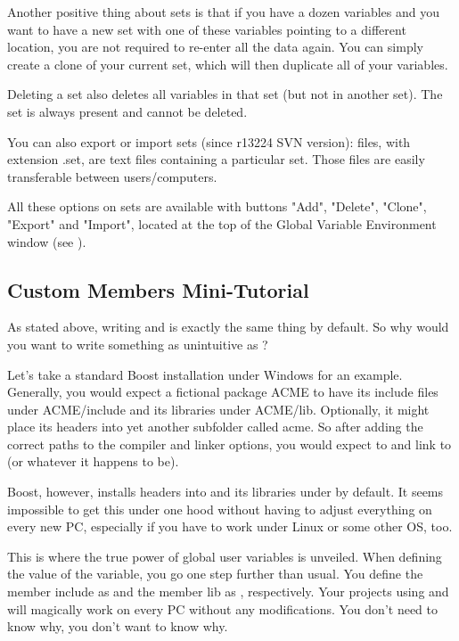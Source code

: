 Another positive thing about sets is that if you have a dozen variables and you want to have a new set with one of these variables pointing to a different location, you are not required to re-enter all the data again. You can simply create a clone of your current set, which will then duplicate all of your variables.

Deleting a set also deletes all variables in that set (but not in another set). The  set is always present and cannot be deleted.

You can also export or import sets (since r13224 SVN version): files, with extension .set, are text files containing a particular set. Those files are easily transferable between users/computers.

All these options on sets are available with buttons "Add", "Delete", "Clone", "Export" and "Import", located at the top of the Global Variable Environment window (see ).

\subsection{Custom Members Mini-Tutorial}\label{sec:mini_tutorial}

As stated above, writing  and  is exactly the same thing by default. So why would you want to write something as unintuitive as ?

Let's take a standard Boost installation under Windows for an example. Generally, you would expect a fictional package ACME to have its include files under ACME/include and its libraries under ACME/lib. Optionally, it might place its headers into yet another subfolder called acme. So after adding the correct paths to the compiler and linker options, you would expect to  and link to  (or whatever it happens to be).

Boost, however, installs headers into  and its libraries under  by default. It seems impossible to get this under one hood without having to adjust everything on every new PC, especially if you have to work under Linux or some other OS, too.

This is where the true power of global user variables is unveiled. When defining the value of the  variable, you go one step further than usual. You define the member include as  and the member lib as , respectively. Your projects using  and  will magically work on every PC without any modifications. You don't need to know why, you don't want to know why.

